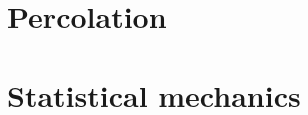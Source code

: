 \documentclass[10pt]{book}
\begin{document}






\part{Percolation}










\part{Statistical mechanics}









\end{document}
